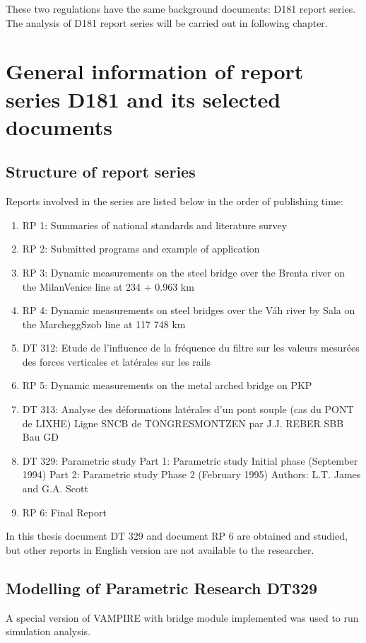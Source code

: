\begin{appendices}
These two regulations have the same background documents: D181 report series. The analysis of D181 report series will be carried out in following chapter.

\chapter{General information of report series D181 and its selected documents}\label{app:generalInformationD181}

\section{Structure of report series}

Reports involved in the series are listed below in the order of publishing time:

\begin{enumerate}
    \item RP 1: Summaries of national standards and literature survey
    \item RP 2: Submitted programs and example of application
    \item RP 3: Dynamic measurements on the steel bridge over the Brenta river on the MilanVenice line at 234 + 0.963 km
    \item RP 4: Dynamic measurements on steel bridges over the Váh river by Sala on the MarcheggSzob line at 117 748 km
    \item DT 312: Etude de l'influence de la fréquence du filtre sur les valeurs mesurées des forces verticales et latérales sur les rails
    \item RP 5: Dynamic measurements on the metal arched bridge on PKP
    \item DT 313: Analyse des déformations latérales d'un pont souple (cas du PONT de LIXHE) Ligne SNCB de TONGRESMONTZEN par J.J. REBER SBB Bau GD
    \item DT 329: Parametric study Part 1: Parametric study Initial phase (September 1994) Part 2: Parametric study Phase 2 (February 1995) Authors: L.T. James and G.A. Scott
    \item RP 6: Final Report
\end{enumerate}

In this thesis document DT 329 and document RP 6 are obtained and studied, but other reports in English version are not available to the researcher.

\section{Modelling of Parametric Research DT329}\label{sec:modelling329}
A special version of VAMPIRE with bridge module implemented was used to run simulation analysis. 


\end{appendices}
